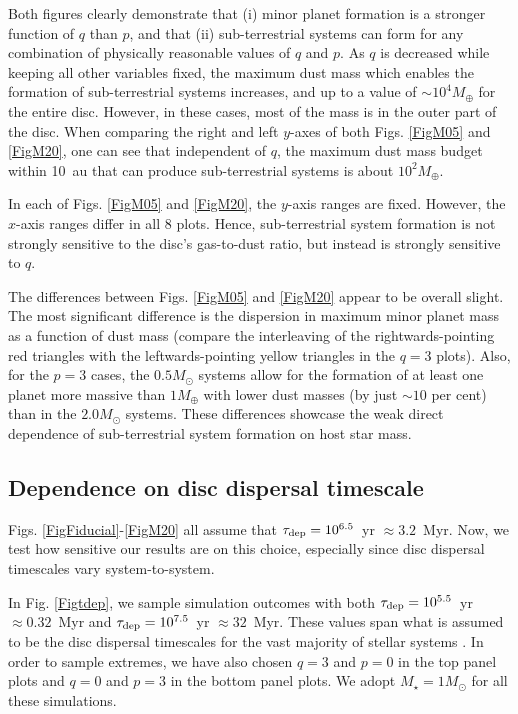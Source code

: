 \documentclass[useAMS,usenatbib]{mn2e}
\begin{document}
Both figures clearly demonstrate that (i) minor planet formation is a stronger function of $q$ than $p$, and that (ii) sub-terrestrial systems can form for any combination of physically reasonable values of $q$ and $p$. As $q$ is decreased while keeping all other variables fixed, the maximum dust mass which enables the formation of sub-terrestrial systems increases, and up to a value of $\sim10^4M_{\oplus}$ for the entire disc. However, in these cases, most of the mass is in the outer part of the disc. When comparing the right and left $y$-axes of both Figs. \ref{FigM05} and \ref{FigM20}, one can see that independent of $q$, the maximum dust mass budget within 10~au that can produce sub-terrestrial systems is about $10^{2}M_{\oplus}$.

In each of Figs. \ref{FigM05} and \ref{FigM20}, the $y$-axis ranges are fixed. However, the $x$-axis ranges differ in all 8 plots. Hence, sub-terrestrial system formation is not strongly sensitive to the disc's gas-to-dust ratio, but instead is strongly sensitive to $q$.

The differences between Figs. \ref{FigM05} and \ref{FigM20} appear to be overall slight. The most significant difference is the dispersion in maximum minor planet mass as a function of dust mass (compare the interleaving of the rightwards-pointing red triangles with the leftwards-pointing yellow triangles in the $q=3$ plots). Also, for the $p=3$ cases, the $0.5M_{\odot}$ systems allow for the formation of at least one planet more massive than $1M_{\oplus}$ with lower dust masses (by just $\sim 10$ per cent) than in the $2.0M_{\odot}$ systems. These differences showcase the weak direct dependence of sub-terrestrial system formation on host star mass.


\subsection{Dependence on disc dispersal timescale}

Figs. \ref{FigFiducial}-\ref{FigM20} all assume that $\tau_{\rm dep} = 10^{6.5}$~yr $\approx 3.2$~Myr. Now, we test how sensitive our results are on this choice, especially since disc dispersal timescales vary system-to-system. 

In Fig. \ref{Figtdep}, we sample simulation outcomes with both $\tau_{\rm dep} = 10^{5.5}$~yr $\approx 0.32$~Myr and $\tau_{\rm dep} = 10^{7.5}$~yr $\approx 32$~Myr. These values span what is assumed to be the disc dispersal timescales for the vast majority of stellar systems \citep{mamajek2009,ercetal2011,ribetal2015,lixia2016,monetal2023}. In order to sample extremes, we have also chosen $q=3$ and $p=0$ in the top panel plots and $q=0$ and $p=3$ in the bottom panel plots. We adopt $M_{\star}=1M_{\odot}$ for all these simulations.
\end{document}

